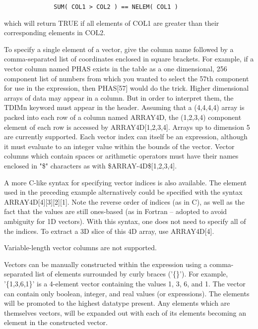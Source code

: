 \documentclass[11pt]{book}
\begin{document}
\begin{verbatim}
              SUM( COL1 > COL2 ) == NELEM( COL1 )
\end{verbatim}

    which will return TRUE if all elements  of  COL1  are  greater  than
    their corresponding elements in COL2.

    To  specify  a  single  element  of  a  vector, give the column name
    followed by  a  comma-separated  list  of  coordinates  enclosed  in
    square  brackets.  For example, if a vector column named PHAS exists
    in the table as a one dimensional, 256  component  list  of  numbers
    from  which  you  wanted to select the 57th component for use in the
    expression, then PHAS[57] would do the  trick.   Higher  dimensional
    arrays  of  data  may appear in a column.  But in order to interpret
    them, the TDIMn keyword must appear in the header.  Assuming that  a
    (4,4,4,4)  array  is packed into each row of a column named ARRAY4D,
    the  (1,2,3,4)  component  element  of  each  row  is  accessed   by
    ARRAY4D[1,2,3,4].    Arrays   up   to   dimension  5  are  currently
    supported.  Each vector index can itself be an expression,  although
    it  must  evaluate  to  an  integer  value  within the bounds of the
    vector.  Vector columns which contain spaces or arithmetic operators
    must   have   their   names  enclosed  in  "\$"  characters  as  with
    \$ARRAY-4D\$[1,2,3,4].

    A  more  C-like  syntax  for  specifying  vector  indices  is   also
    available.   The element used in the preceding example alternatively
    could be specified with the syntax  ARRAY4D[4][3][2][1].   Note  the
    reverse  order  of  indices  (as in C), as well as the fact that the
    values are still ones-based (as  in  Fortran  --  adopted  to  avoid
    ambiguity  for  1D vectors).  With this syntax, one does not need to
    specify all of the indices.  To  extract  a  3D  slice  of  this  4D
    array, use ARRAY4D[4].

    Variable-length vector columns are not supported.

    Vectors can  be manually constructed  within the expression  using a
    comma-separated list of  elements surrounded by curly braces ('\{\}').
    For example, '\{1,3,6,1\}' is a 4-element vector containing the values
    1, 3, 6, and 1.  The  vector can contain  only boolean, integer, and
    real values (or expressions).  The elements will  be promoted to the
    highest  datatype   present.  Any   elements   which  are themselves
    vectors, will be expanded out with  each of its elements becoming an
    element in the constructed vector.
\end{document}
